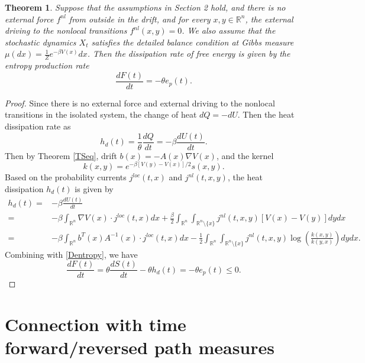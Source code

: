 \documentclass[10pt]{article}
\newtheorem{thm}{Theorem}[section]
\theoremstyle{definition}
\theoremstyle{remark}
\numberwithin{equation}{section}
\begin{document}
\begin{thm}
Suppose that the assumptions in Section 2 hold,  and there is no external force $f^{nl}$ from outside in the drift, and for every $x,y \in \mathbb{R}^n$, the external driving to the nonlocal transitions  $f^{nl}(x,y)=0$. We also assume that the stochastic dynamics $X_t$ satisfies the detailed balance condition at Gibbs measure $\mu(dx) = \frac{1}{Z}e^{-\beta V(x)}dx$.
Then the dissipation rate of free energy is given by the entropy production rate
\begin{equation*}
    \frac{d F(t)}{dt} = - \theta e_{p}(t).
\end{equation*}
\end{thm}
\begin{proof}
Since there is no external force and external driving to the nonlocal transitions in the isolated system, the change of heat $dQ = -dU$. Then the heat dissipation rate as 
\begin{equation*}
    h_{d}(t) = \frac{1}{\theta} \frac{dQ}{dt} = -\beta\frac{d U(t)}{dt}.
\end{equation*}
Then by Theorem \ref{TSeq}, drift $b(x) = -A(x)\nabla V(x)$, and the kernel
\begin{equation*}
    k(x,y) = e^{-\beta[V(y)-V(x)]/2} s(x,y).
\end{equation*}
Based on the probability currents $j^{loc}(t,x)$ and $j^{nl}(t,x,y)$, the heat dissipation $h_{d}(t)$ is given by
\begin{align}
    h_{d}(t) = &- \beta\frac{d U(t)}{dt} \nonumber\\
             = & -\beta\int_{\mathbb{R}^n} \nabla V(x) \cdot j^{loc}(t,x)dx + \frac{\beta}{2}\int_{\mathbb{R}^n} \int_{\mathbb{R}^n \setminus \{x\}} j^{nl}(t,x,y)  [V(x) - V(y)] dydx \nonumber \\
             = & -\beta\int_{\mathbb{R}^n} b^T(x)A^{-1}(x)\cdot j^{loc}(t,x)dx - \frac{1}{2}\int_{\mathbb{R}^n}\int_{\mathbb{R}^n \setminus \{x\}} j^{nl}(t,x,y)\log \left( \frac{k(x,y)}{k(y,x)} \right) dydx .
\end{align}
Combining with \eqref{Dentropy}, we have
\begin{equation*}
     \frac{d F(t)}{dt} = \theta\frac{dS(t)}{dt} - \theta h_{d}(t) = - \theta e_{p}(t) \leq  0.
\end{equation*}
\end{proof}

\section{Connection with time forward/reversed path measures}\label{Sec4}
\end{document}
